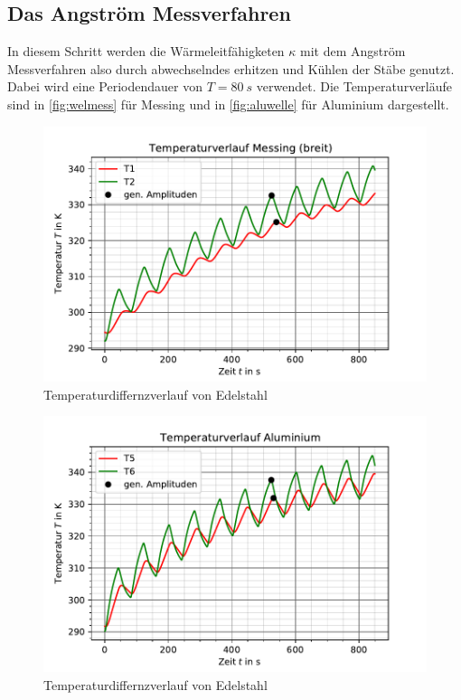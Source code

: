 \subsection{Das Angström Messverfahren}
In diesem Schritt werden die Wärmeleitfähigketen $\kappa$ mit dem Angström Messverfahren also durch
abwechselndes erhitzen und Kühlen der Stäbe genutzt. Dabei wird eine Periodendauer von $T=\SI[]{80}[]{s}$
verwendet. Die Temperaturverläufe sind in \autoref{fig:welmess} für Messing und in \autoref{fig:aluwelle} für Aluminium dargestellt.
\begin{figure}
    \centering
    \includegraphics{wellemessing.pdf}
    \caption{Temperaturdiffernzverlauf von Edelstahl}
    \label{fig:wellmess}
  \end{figure}
  \begin{figure}
    \centering
    \includegraphics{wellenalu.pdf}
    \caption{Temperaturdiffernzverlauf von Edelstahl}
    \label{fig:aluwelle}
  \end{figure}
